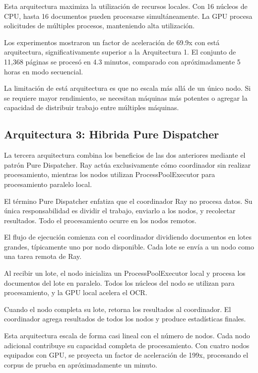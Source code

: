 \documentclass[12pt,a4paper,twoside]{book}
\begin{document}
Esta arquitectura maximiza la utilización de recursos locales. Con 16 núcleos de CPU, hasta 16 documentos pueden procesarse simultáneamente. La GPU procesa solicitudes de múltiples procesos, manteniendo alta utilización.

Los experimentos mostraron un factor de aceleración de 69.9x con está arquitectura, significativamente superior a la Arquitectura 1. El conjunto de 11,368 páginas se procesó en 4.3 minutos, comparado con apróximadamente 5 horas en modo secuencial.

La limitación de está arquitectura es que no escala más allá de un único nodo. Si se requiere mayor rendimiento, se necesitan máquinas más potentes o agregar la capacidad de distribuir trabajo entre múltiples máquinas.

\subsection{Arquitectura 3: Hibrida Pure Dispatcher}

La tercera arquitectura combina los beneficios de las dos anteriores mediante el patrón Pure Dispatcher. Ray actúa exclusivamente cómo coordinador sin realizar procesamiento, mientras los nodos utilizan ProcessPoolExecutor para procesamiento paralelo local.

El término Pure Dispatcher enfatiza que el coordinador Ray no procesa datos. Su única responsabilidad es dividir el trabajo, enviarlo a los nodos, y recolectar resultados. Todo el procesamiento ocurre en los nodos remotos.

El flujo de ejecución comienza con el coordinador dividiendo documentos en lotes grandes, típicamente uno por nodo disponible. Cada lote se envía a un nodo como una tarea remota de Ray.

Al recibir un lote, el nodo inicializa un ProcessPoolExecutor local y procesa los documentos del lote en paralelo. Todos los núcleos del nodo se utilizan para procesamiento, y la GPU local acelera el OCR.

Cuando el nodo completa su lote, retorna los resultados al coordinador. El coordinador agrega resultados de todos los nodos y produce estadísticas finales.

Esta arquitectura escala de forma casi lineal con el número de nodos. Cada nodo adicional contribuye su capacidad completa de procesamiento. Con cuatro nodos equipados con GPU, se proyecta un factor de aceleración de 199x, procesando el corpus de prueba en apróximadamente un minuto.
\end{document}
